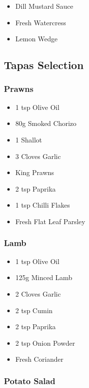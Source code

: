 \documentclass[11pt, english]{article}
\begin{document}
	\begin{itemize}
        \setlength\itemsep{0cm}
                \item Dill Mustard Sauce
		\item Fresh Watercress
		\item Lemon Wedge
        \end{itemize}

\newpage

	\subsection{Tapas Selection}

		\subsubsection*{Prawns}

	\begin{itemize}
        \setlength\itemsep{0cm}
                \item 1 tsp Olive Oil
		\item 80g Smoked Chorizo
		\item 1 Shallot
		\item 3 Cloves Garlic
		\item King Prawns
		\item 2 tsp Paprika
		\item 1 tsp Chilli Flakes
		\item Fresh Flat Leaf Parsley
        \end{itemize}

		\subsubsection*{Lamb}

	\begin{itemize}
        \setlength\itemsep{0cm}
                \item 1 tsp Olive Oil
		\item 125g Minced Lamb
		\item 2 Cloves Garlic
		\item 2 tsp Cumin
		\item 2 tsp Paprika
		\item 2 tsp Onion Powder
		\item Fresh Coriander
        \end{itemize}

		\subsubsection*{Potato Salad}
\end{document}
